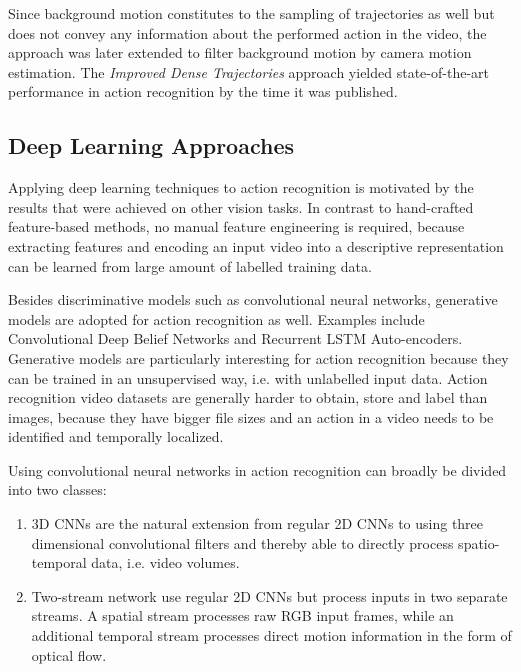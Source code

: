 Since background motion constitutes to the sampling of trajectories as well but does not convey any information about the performed action in the video, the approach was later extended to filter background motion by camera motion estimation\cite{wang_action_2013}.
The \textit{Improved Dense Trajectories} approach yielded state-of-the-art performance in action recognition by the time it was published. 

\subsection{Deep Learning Approaches}

Applying deep learning techniques to action recognition is motivated by the results that were achieved on other vision tasks. 
In contrast to hand-crafted feature-based methods, no manual feature engineering is required, because extracting features and encoding an input video into a descriptive representation can be learned from large amount of labelled training data.

Besides discriminative models such as convolutional neural networks, generative models are adopted for action recognition as well.
Examples include Convolutional Deep Belief Networks\cite{palasek_action_2016} and Recurrent LSTM Auto-encoders\cite{srivastava_unsupervised_2015}.
Generative models are particularly interesting for action recognition because they can be trained in an unsupervised way, i.e. with unlabelled input data.
Action recognition video datasets are generally harder to obtain, store and label than images, because they have bigger file sizes and an action in a video needs to be identified and temporally localized.

Using convolutional neural networks in action recognition can broadly be divided into two classes:
\begin{enumerate}
\item 3D CNNs are the natural extension from regular 2D CNNs to using three dimensional convolutional filters and thereby able to directly process spatio-temporal data, i.e. video volumes.
\item Two-stream network use regular 2D CNNs but process inputs in two separate streams.
A spatial stream processes raw RGB input frames, while an additional temporal stream processes direct motion information in the form of optical flow.
\end{enumerate}

